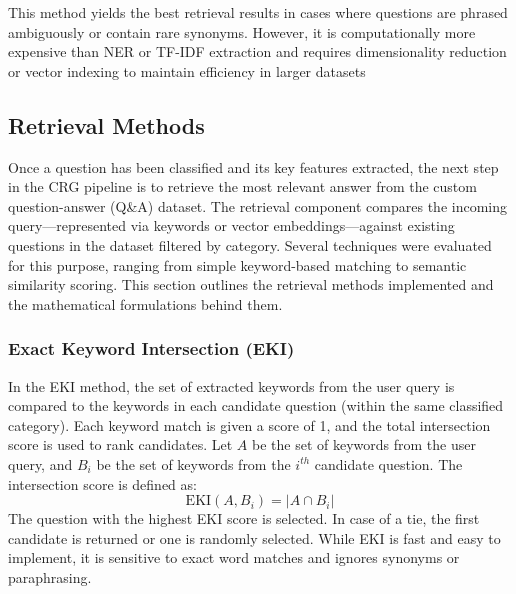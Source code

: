\documentclass[conference]{IEEEtran}
\begin{document}
This method yields the best retrieval results in cases where questions are phrased ambiguously or contain rare synonyms. 
However, it is computationally more expensive than NER or TF-IDF extraction and requires dimensionality reduction or vector indexing to maintain efficiency in larger datasets

\subsection{Retrieval Methods}
Once a question has been classified and its key features extracted, the next step in the CRG pipeline is to retrieve the most relevant answer from the custom question-answer (Q\&A) dataset. 
The retrieval component compares the incoming query—represented via keywords or vector embeddings—against existing questions in the dataset filtered by category. 
Several techniques were evaluated for this purpose, ranging from simple keyword-based matching to semantic similarity scoring. 
This section outlines the retrieval methods implemented and the mathematical formulations behind them.

\subsubsection{Exact Keyword Intersection (EKI)}
In the EKI method, the set of extracted keywords from the user query is compared to the keywords in each candidate question (within the same classified category). 
Each keyword match is given a score of 1, and the total intersection score is used to rank candidates.
Let $A$ be the set of keywords from the user query, and $B_i$ be the set of keywords from the $i^{th}$ candidate question.
The intersection score is defined as:
\begin{equation}
    \text{EKI}(A, B_i) = |A \cap B_i| 
\end{equation}
The question with the highest EKI score is selected. 
In case of a tie, the first candidate is returned or one is randomly selected. 
While EKI is fast and easy to implement, it is sensitive to exact word matches and ignores synonyms or paraphrasing.
\end{document}
